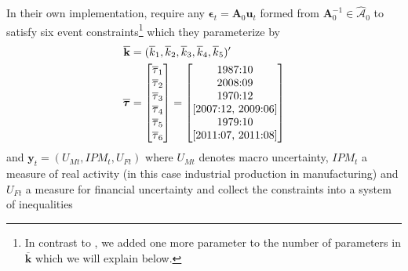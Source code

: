 \documentclass[a4paper,11pt,listof=nochaptergap,oneside,pointednumbers,bibtotoc,bigheadings,liststotoc,hidelinks]{scrbook}
\theoremstyle{mysatz}
\theoremstyle{mydefinition}
\theoremstyle{mytheorem}
\theoremstyle{mybemerkung}
\let\oldhat\hat
\newcommand{\vect}[1]{\boldsymbol{\mathbf{#1}}}
\newcommand{\hatt}[1]{\oldhat{\boldsymbol{\mathbf{#1}}}}
\begin{document}
In their own implementation, \citet{ludvigsonetal:19} require any $\vect{\epsilon}_t = \vect{A}_0 \vect{u}_t$ formed from $\vect{A}_0^{-1} \in \hatt{\mathcal{A}}_0$ to satisfy six event constraints\footnote{In contrast to \citet{ludvigsonetal:19}, we added one more parameter to the number of parameters in $\overline{\vect{k}}$ which we will explain below.} which they parameterize by 
\begin{equation}
\begin{split}
\overline{\vect{k}} & = (\overline{k}_1, \overline{k}_2, \overline{k}_3, \overline{k}_4, \overline{k}_5)'\\
\overline{\vect{\tau}} & = \begin{bmatrix}
			\overline{\tau}_1 \\
			\overline{\tau}_2 \\
			\overline{\tau}_3 \\
			\overline{\tau}_4 \\
			\overline{\tau}_5 \\
			\overline{\tau}_6
			\end{bmatrix} = 
			\begin{bmatrix}
			$1987:10$ \\
			$2008:09$ \\
			$1970:12$ \\
			$[2007:12, 2009:06]$ \\
			$1979:10$ \\
			$[2011:07, 2011:08]$
			\end{bmatrix}
\end{split}
\end{equation}
 and $\vect{y}_t = (U_{Mt}, IPM_{t}, U_{Ft})$ where $U_{Mt}$ denotes macro uncertainty, $IPM_{t}$ a measure of real activity (in this case industrial production in manufacturing) and $U_{Ft}$ a measure for financial uncertainty and collect the constraints into a system of inequalities
\end{document}

